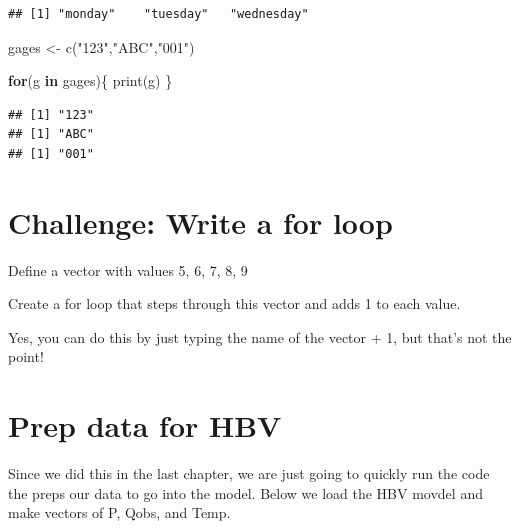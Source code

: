 \documentclass[
]{book}
\newenvironment{Shaded}{\begin{snugshade}}{\end{snugshade}}
\newcommand{\ControlFlowTok}[1]{\textcolor[rgb]{0.13,0.29,0.53}{\textbf{#1}}}
\newcommand{\FunctionTok}[1]{\textcolor[rgb]{0.00,0.00,0.00}{#1}}
\newcommand{\NormalTok}[1]{#1}
\newcommand{\OtherTok}[1]{\textcolor[rgb]{0.56,0.35,0.01}{#1}}
\newcommand{\StringTok}[1]{\textcolor[rgb]{0.31,0.60,0.02}{#1}}
\begin{document}
\begin{verbatim}
## [1] "monday"    "tuesday"   "wednesday"
\end{verbatim}

\begin{Shaded}
\begin{Highlighting}[]
\NormalTok{gages }\OtherTok{\textless{}{-}} \FunctionTok{c}\NormalTok{(}\StringTok{"123"}\NormalTok{,}\StringTok{"ABC"}\NormalTok{,}\StringTok{"001"}\NormalTok{)}

\ControlFlowTok{for}\NormalTok{(g }\ControlFlowTok{in}\NormalTok{ gages)\{}
  \FunctionTok{print}\NormalTok{(g)}
\NormalTok{\}}
\end{Highlighting}
\end{Shaded}

\begin{verbatim}
## [1] "123"
## [1] "ABC"
## [1] "001"
\end{verbatim}

\hypertarget{challenge-write-a-for-loop}{%
\section{Challenge: Write a for loop}\label{challenge-write-a-for-loop}}

Define a vector with values 5, 6, 7, 8, 9

Create a for loop that steps through this vector and adds 1 to each value.

Yes, you can do this by just typing the name of the vector + 1, but that's not the point!

\hypertarget{prep-data-for-hbv}{%
\section{Prep data for HBV}\label{prep-data-for-hbv}}

Since we did this in the last chapter, we are just going to quickly run the code the preps our data to go into the model. Below we load the HBV movdel and make vectors of P, Qobs, and Temp.
\end{document}
